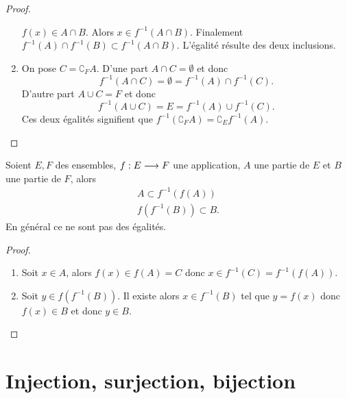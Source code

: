 \begin{proof}
\begin{enumerate}
            \(f(x) \in A \cap B\). Alors \(x \in f^{-1}(A \cap B)\). Finalement 
            \(f^{-1}(A) \cap f^{-1}(B) \subset f^{-1}(A \cap B)\). L'égalité 
            résulte des deux inclusions.
        \item On pose \(C=\complement_F A\). D'une part \(A \cap C =\emptyset\) 
            et donc
            \begin{equation}
                f^{-1}(A \cap C)=\emptyset=f^{-1}(A) \cap f^{-1}(C).
            \end{equation}
            D'autre part \(A \cup C =F\) et donc
            \begin{equation}
                f^{-1}(A \cup C) = E = f^{-1}(A) \cup f^{-1}(C).
            \end{equation}
            Ces deux égalités signifient que \(f^{-1}(\complement_F A) = 
            \complement_E f^{-1}(A)\).           
    \end{enumerate}
\end{proof}
%
\begin{prop}
    Soient \(E,F\) des ensembles, \(f:E \longrightarrow F\) une application, \(A\) 
    une partie de \(E\) et \(B\) une partie de \(F\), alors
    \begin{gather}
        A \subset f^{-1}(f(A)) \\
        f(f^{-1}(B)) \subset B.
    \end{gather}
    En général ce ne sont pas des égalités.
\end{prop}
\begin{proof}
    \begin{enumerate}
        \item Soit \(x \in A\), alors \(f(x) \in f(A) = C\) donc \(x \in 
            f^{-1}(C)=f^{-1}(f(A))\).
        \item Soit \(y \in f(f^{-1}(B))\). Il existe alors \(x \in f^{-1}(B)\) 
            tel que \(y=f(x)\) donc \(f(x) \in B\) et donc \(y \in B\).
    \end{enumerate}
\end{proof}
\section{Injection, surjection, bijection}
\label{chap3-sec:injsurbij}
